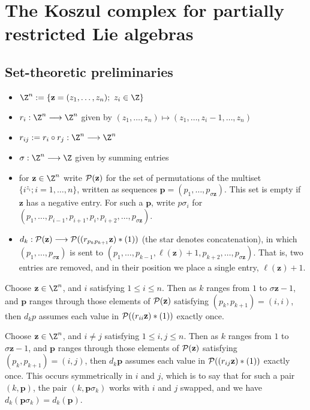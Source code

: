 \documentclass[11pt]{article}
\begin{document}
\section*{The Koszul complex for partially restricted Lie algebras}

\subsection*{Set-theoretic preliminaries}

\begin{itemize}
\setlength{\parindent}{.25in}
\item $\Z^n:=\{\textbf{z}=(z_1,\ldots,z_n);\ z_i\in\Z\}$
\item $r_i:\Z^n\to\Z^n$ given by $(z_1,\ldots,z_n)\mapsto(z_1,\ldots,z_i-1,\ldots,z_n)$
\item $r_{ij}:=r_i\circ r_j:\Z^n\to\Z^n$
\item $\sigma:\Z^n\to\Z$ given by summing entries
\item for $\textbf{z}\in\Z^n$ write $\mathcal{P}(\textbf{z})$ for the set of permutations of the multiset $\{i^{z_i};i=1,\ldots,n\}$, written as sequences $\textbf{p}=(p_1,\ldots,p_{\sigma \textbf{z}})$. This set is empty if $\textbf{z}$ has a negative entry. For such a $\textbf{p}$, write $p\sigma_i$ for $(p_1,\ldots,p_{i-1},p_{i+1},p_{i},p_{i+2},\ldots,p_{\sigma \textbf{z}})$.
\item $d_k:\mathcal{P}(\textbf{z})\longrightarrow\mathcal{P}((r_{p_kp_{k+1}}\textbf{z})*(1))$ (the star denotes concatenation), in which $(p_1,\ldots,p_{\sigma \textbf{z}})$ is sent to $(p_1,\ldots,p_{k-1},\ell(\textbf{z})+1,p_{k+2},\ldots,p_{\sigma \textbf{z}})$. That is, two entries are removed, and in their position we place a single entry, $\ell(\textbf{z})+1$.
\end{itemize}
\begin{prop*}
Choose $\textbf{z}\in\Z^n$, and $i$ satisfying $1\leq i\leq n$. Then as $k$ ranges from $1$ to $\sigma \textbf{z}-1$, and $\textbf{p}$ ranges through those elements of $\mathcal{P}(\textbf{z})$ satisfying $(p_k,p_{k+1})=(i,i)$, then $d_kp$ assumes each value in $\mathcal{P}((r_{ii}\textbf{z})*(1))$ exactly once.
\end{prop*}
\begin{prop*}
Choose $\textbf{z}\in\Z^n$, and $i\neq j$ satisfying $1\leq i,j\leq n$. Then as $k$ ranges from $1$ to $\sigma \textbf{z}-1$, and $\textbf{p}$ ranges through those elements of $\mathcal{P}(\textbf{z})$ satisfying $(p_k,p_{k+1})=(i,j)$, then $d_k\textbf{p}$ assumes each value in $\mathcal{P}((r_{ij}\textbf{z})*(1))$ exactly once. This occurs symmetrically in $i$ and $j$, which is to say that for such a pair $(k,\textbf{p})$, the pair $(k,\textbf{p}\sigma_k)$ works with $i$ and $j$ swapped, and we have $d_k(\textbf{p}\sigma_k)=d_k(\textbf{p})$.
\end{prop*}
\end{document}
